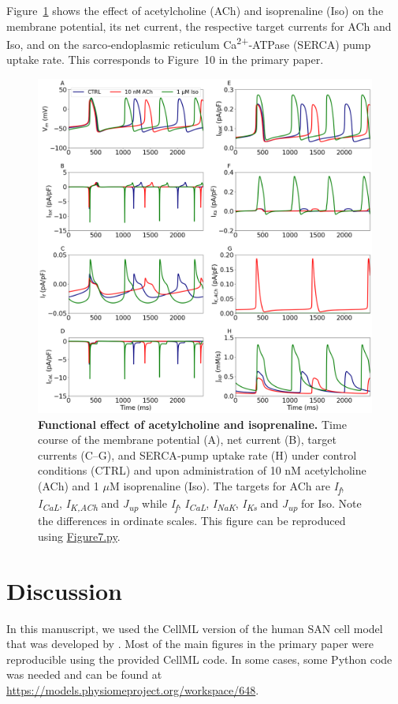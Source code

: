 \documentclass[fleqn,10pt]{physiome}
\begin{document}
Figure~\ref{Figure7} shows the effect of acetylcholine (ACh) and isoprenaline (Iso) on the membrane potential, its net current, the respective target currents for ACh and Iso, and on the sarco‐endoplasmic reticulum Ca\textsuperscript{2+}‐ATPase (SERCA) pump uptake rate. This corresponds to Figure~10 in the primary paper.
\begin{figure}[htbp]
\centering
\includegraphics[width=0.95\linewidth]{Figure7}
\caption{\textbf{Functional effect of acetylcholine and isoprenaline.}\newline
Time course of the membrane potential (A), net current (B), target currents (C–G), and SERCA‐pump uptake rate (H) under control conditions (CTRL) and upon administration of 10 nM acetylcholine (ACh) and 1 $\mu$M isoprenaline (Iso). The targets for ACh are \textit{I\textsubscript{f}}, \textit{I\textsubscript{CaL}}, \textit{I\textsubscript{K,ACh}} and \textit{J\textsubscript{up}} while \textit{I\textsubscript{f}}, \textit{I\textsubscript{CaL}}, \textit{I\textsubscript{NaK}}, \textit{I\textsubscript{Ks}} and \textit{J\textsubscript{up}} for Iso. Note the differences in ordinate scales. This figure can be reproduced using \href{https://models.physiomeproject.org/workspace/648/rawfile/6784d6c3256c832dc98b2db42c85747ae2596518/Figure7.py}{Figure7.py}.}
\label{Figure7}
\end{figure}

\section{Discussion}

In this manuscript, we used the CellML version of the human SAN cell model that was developed by \citet{fabbri2017computational}. Most of the main figures in the primary paper were reproducible using the provided CellML code. In some cases, some Python code was needed and can be found at \url{https://models.physiomeproject.org/workspace/648}.\newline


\end{document}
